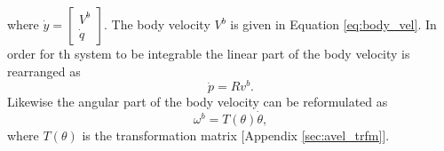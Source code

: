 where $\dot y = \begin{bmatrix} V^b \\ \dot q \end{bmatrix}$. The body velocity $V^b$ is given in Equation \ref{eq:body_vel}. In order for th system to be integrable the linear part of the body velocity is rearranged as 
\begin{equation}
    \label{eq:transfo_linvel}
    \dot p = R v^b.
\end{equation}
Likewise the angular part of the body velocity can be reformulated as 
\begin{equation}
    \label{eq:transfo_angvel}
    \omega^b = T(\theta)\dot{\theta},
\end{equation}
where $T(\theta)$ is the transformation matrix [Appendix \ref{sec:avel_trfm}]. 

